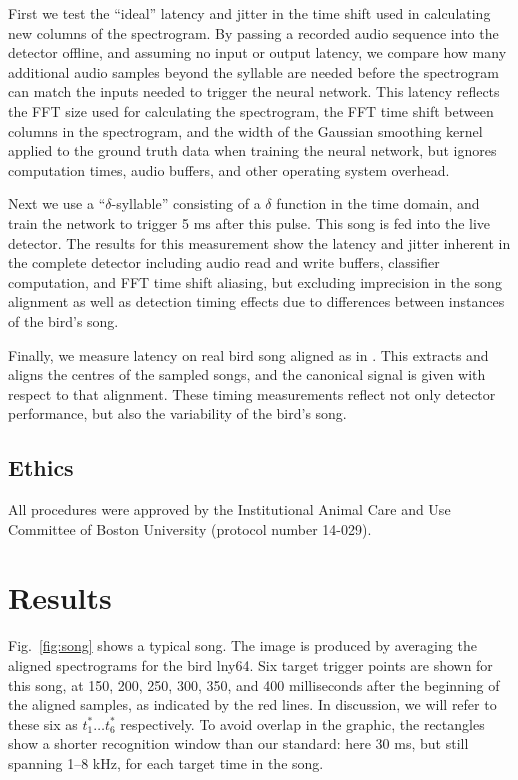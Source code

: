 \documentclass[10pt,letterpaper]{article}
\newcommand\fig[1]{Fig.~\ref{#1}}
\begin{document}
First we test the ``ideal'' latency and jitter in the time shift used
in calculating new columns of the spectrogram. By passing a recorded
audio sequence into the detector offline, and assuming no input or
output latency, we compare how many additional audio samples beyond
the syllable are needed before the spectrogram can match the inputs
needed to trigger the neural network.  This latency reflects the FFT
size used for calculating the spectrogram, the FFT time shift between
columns in the spectrogram, and the width of the Gaussian smoothing
kernel applied to the ground truth data when training the neural
network, but ignores computation times, audio buffers, and other
operating system overhead.

Next we use a ``$\delta$-syllable'' consisting of a $\delta$ function
in the time domain, and train the network to trigger 5 ms after this
pulse.  This song is fed into the live detector.  The results for this
measurement show the latency and jitter inherent in the complete
detector including audio read and write buffers, classifier
computation, and FFT time shift aliasing, but excluding imprecision in
the song alignment as well as detection timing effects due to
differences between instances of the bird's song.

Finally, we measure latency on real bird song aligned as in
\cite{Poole2012}.  This extracts and aligns the centres of the sampled
songs, and the canonical signal is given with respect to that
alignment.  These timing measurements reflect not only detector
performance, but also the variability of the bird's song.

\subsection{Ethics}

All procedures were approved by the Institutional Animal Care and Use
Committee of Boston University (protocol number 14-029).

\section{Results}
\label{sec:results}

\fig{fig:song} shows a typical song. The image is produced by
averaging the aligned spectrograms for the bird lny64.  Six target
trigger points are shown for this song, at 150, 200, 250, 300, 350,
and 400 milliseconds after the beginning of the aligned samples, as
indicated by the red lines. In discussion, we will refer to these six
as $t^*_1\ldots t^*_6$ respectively.  To avoid overlap in the graphic, the rectangles show
a shorter recognition window than our standard: here 30 ms, but still
spanning 1--8 kHz, for each target time in the song.
\end{document}
